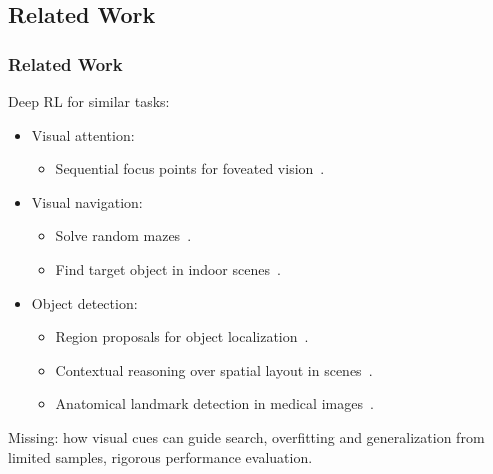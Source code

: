 \subsection{Related Work}

\begin{frame}
    \frametitle{Related Work}

    Deep RL for similar tasks:

    \begin{itemize}
        \item Visual attention:
        \begin{itemize}
            \item Sequential focus points for foveated vision~\cite{mnih_recurrent_2014}.
        \end{itemize}
        \item Visual navigation:
        \begin{itemize}
            \item Solve random mazes~\cite{mirowski_learning_2017}.
            \item Find target object in indoor scenes~\cite{zhu_target-driven_2017}.
        \end{itemize}
        \item Object detection:
        \begin{itemize}
            \item Region proposals for object localization~\cite{caicedo_active_2015}.
            \item Contextual reasoning over spatial layout in scenes~\cite{chen_spatial_2017}.
            \item Anatomical landmark detection in medical images~\cite{ghesu_multi-scale_2019}.
        \end{itemize}
    \end{itemize}

    Missing: how visual cues can guide search, overfitting and generalization from limited samples, rigorous performance evaluation.
\end{frame}